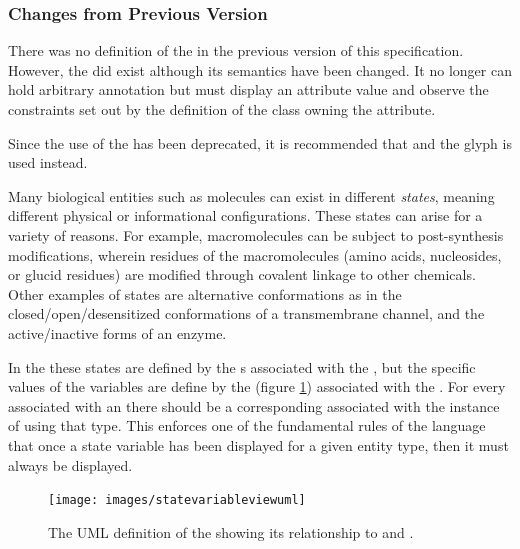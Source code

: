 \subsubsection{Changes from Previous Version}

There was no definition of the  in the
previous version of this specification. However, the  did exist although its semantics have been changed. It
no longer can hold arbitrary annotation but must display an attribute
value and observe the constraints set out by the definition of the
class owning the attribute.

Since the use of the  has been deprecated,
it is recommended that  and the
 glyph is used instead.

\label{defn:StateVariable}

Many biological entities such as molecules can exist in different
\emph{states}, meaning different physical or informational
configurations.  These states can arise for a variety of reasons.  For
example, macromolecules can be subject to post-synthesis
modifications, wherein residues of the macromolecules (amino acids,
nucleosides, or glucid residues) are modified through covalent linkage
to other chemicals.  Other examples of states are alternative
conformations as in the closed/open/de\-sen\-si\-tized conformations of a
transmembrane channel, and the active/inactive forms of an enzyme.

In the \PDl these states are defined by the
s associated with the
, but the specific values of the variables are
define by the  (figure
\ref{fig:techref:statevariableviewuml}) associated with the
. For every
 associated with an
 there should be a corresponding
 associated with the instance of
 using that type. This enforces one of the
fundamental rules of the language that once a state variable has been
displayed for a given entity type, then it must always be displayed.

\begin{figure}[htb]
  \centering
  \texttt{[image: images/statevariableviewuml]}
  \caption{The UML definition of the  showing
    its relationship to  and .}
  \label{fig:techref:statevariableviewuml}
\end{figure}

